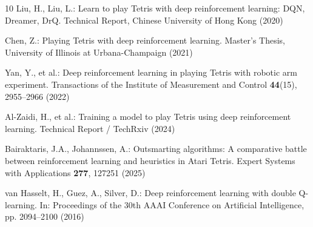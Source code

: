 \documentclass[runningheads]{llncs}
\begin{document}
\begin{thebibliography}{10}
Liu, H., Liu, L.: Learn to play Tetris with deep reinforcement learning: DQN, Dreamer, DrQ. Technical Report, Chinese University of Hong Kong (2020)

Chen, Z.: Playing Tetris with deep reinforcement learning. Master's Thesis, University of Illinois at Urbana-Champaign (2021)

Yan, Y., et al.: Deep reinforcement learning in playing Tetris with robotic arm experiment. Transactions of the Institute of Measurement and Control \textbf{44}(15), 2955--2966 (2022)

Al-Zaidi, H., et al.: Training a model to play Tetris using deep reinforcement learning. Technical Report / TechRxiv (2024)

Bairaktaris, J.A., Johannssen, A.: Outsmarting algorithms: A comparative battle between reinforcement learning and heuristics in Atari Tetris. Expert Systems with Applications \textbf{277}, 127251 (2025)

van Hasselt, H., Guez, A., Silver, D.: Deep reinforcement learning with double Q-learning. In: Proceedings of the 30th AAAI Conference on Artificial Intelligence, pp. 2094--2100 (2016)

\end{thebibliography}
\end{document}
